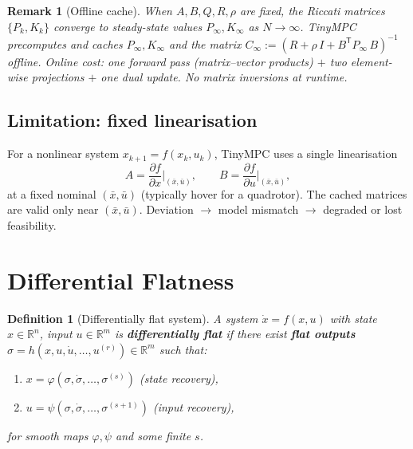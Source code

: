 \documentclass[11pt]{article}
\newtheorem{definition}[theorem]{Definition}
\newtheorem{remark}[theorem]{Remark}
\newcommand{\R}{\mathbb{R}}
\newcommand{\trans}{\mathsf{T}}
\begin{document}
\begin{remark}[Offline cache]\label{rem:cache}
When $A, B, Q, R, \rho$ are fixed,
the Riccati matrices $\{P_k, K_k\}$ converge
to steady-state values $P_\infty, K_\infty$
as $N \to \infty$.
TinyMPC precomputes and caches $P_\infty, K_\infty$
and the matrix
$C_\infty := (R + \rho\, I + B^\trans P_\infty\, B)^{-1}$
offline.
Online cost: one forward pass (matrix--vector products)
$+$ two element-wise projections $+$ one dual update.
No matrix inversions at runtime.
\end{remark}

\subsection{Limitation: fixed linearisation}

For a nonlinear system $x_{k+1} = f(x_k, u_k)$,
TinyMPC uses a single linearisation
\begin{equation}\label{eq:fixed-lin}
  A = \frac{\partial f}{\partial x}\bigg|_{(\bar x, \bar u)},
  \qquad
  B = \frac{\partial f}{\partial u}\bigg|_{(\bar x, \bar u)},
\end{equation}
at a fixed nominal $(\bar x, \bar u)$
(typically hover for a quadrotor).
The cached matrices are valid only near $(\bar x, \bar u)$.
Deviation $\to$ model mismatch $\to$ degraded or
lost feasibility.

\section{Differential Flatness}\label{sec:flatness}

\begin{definition}[Differentially flat system]
\label{def:flat}
A system $\dot x = f(x, u)$ with state $x\in\R^n$,
input $u\in\R^m$ is \textbf{differentially flat}
if there exist \textbf{flat outputs}
$\sigma = h(x, u, \dot u, \ldots, u^{(r)}) \in \R^m$
such that:
\begin{enumerate}[label=(\alph*), leftmargin=8mm]
  \item $x = \varphi(\sigma, \dot\sigma, \ldots,
    \sigma^{(s)})$
    \quad (state recovery),
  \item $u = \psi(\sigma, \dot\sigma, \ldots,
    \sigma^{(s+1)})$
    \quad (input recovery),
\end{enumerate}
for smooth maps $\varphi, \psi$ and some finite $s$.
\end{definition}
\end{document}
